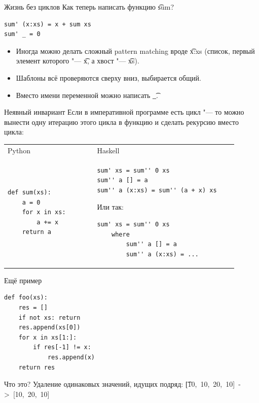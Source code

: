 \begin{frame}[t,fragile]{Жизнь без циклов}
	Как теперь написать функцию \t{sum}? \pause
\begin{verbatim}
sum' (x:xs) = x + sum xs
sum' _ = 0
\end{verbatim}
	\begin{itemize}
		\item Иногда можно делать сложный pattern matching вроде \t{x:xs} (список, первый элемент которого "--- \t{x}, а хвост "--- \t{xs}).
		\item Шаблоны всё проверяются сверху вниз, выбирается общий.
		\item Вместо имени переменной можно написать \t{\_}.
	\end{itemize}
\end{frame}

\begin{frame}[fragile]{Неявный инвариант}
	Если в императивной программе есть цикл "--- то можно вынести одну итерацию этого цикла в функцию и сделать рекурсию вместо цикла:

	\begin{tabular}{p{0.35\linewidth}p{0.55\linewidth}}
		\centering
		Python & Haskell \\
\begin{verbatim}
def sum(xs):
    a = 0
    for x in xs:
        a += x
    return a
\end{verbatim}
		&
\begin{verbatim}
sum' xs = sum'' 0 xs
sum'' a [] = a
sum'' a (x:xs) = sum'' (a + x) xs
\end{verbatim}
\pause
Или так:
\begin{verbatim}
sum' xs = sum'' 0 xs
    where
        sum'' a [] = a
        sum'' a (x:xs) = ...
\end{verbatim}
	\end{tabular}
\end{frame}

\begin{frame}[t, fragile]{Ещё пример}
\begin{verbatim}
def foo(xs):
    res = []
    if not xs: return
    res.append(xs[0])
    for x in xs[1:]:
        if res[-1] != x:
            res.append(x)
    return res
\end{verbatim}
	Что это?
	\pause
	Удаление одинаковых значений, идущих подряд: \t{[10,~10,~20,~10]~->~[10,~20,~10]}
\end{frame}

